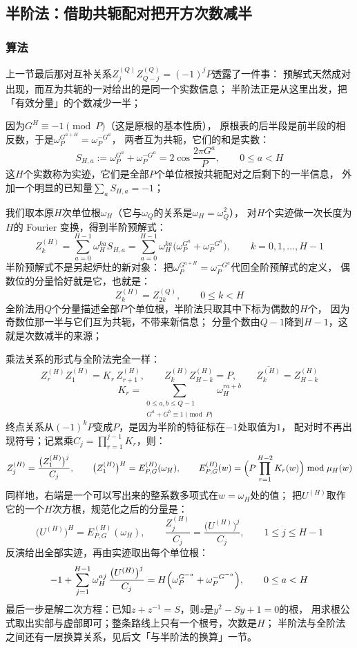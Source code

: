 \documentclass[UTF8,a4paper,11pt]{ctexart}
\begin{document}
\subsection{半阶法：借助共轭配对把开方次数减半}
\subsubsection{算法}
上一节最后那对互补关系$Z^{(Q)}_jZ^{(Q)}_{Q-j}=(-1)^jP$透露了一件事：
预解式天然成对出现，而互为共轭的一对给出的是同一个实数信息；
半阶法正是从这里出发，把「有效分量」的个数减少一半；

因为$G^{H}\equiv-1\pmod P$（这是原根的基本性质），
原根表的后半段是前半段的相反数，于是$\omega_P^{G^{a+H}}=\omega_P^{-G^{a}}$，
两者互为共轭，它们的和是实数：
\[
 S_{H,a}:=\omega_P^{G^{a}}+\omega_P^{-G^{a}}=2\cos\frac{2\pi G^{a}}{P},
 \qquad 0\le a<H
\]
这$H$个实数称为实迹，它们是全部$P$个单位根按共轭配对之后剩下的一半信息，
外加一个明显的已知量$\sum_aS_{H,a}=-1$；\par

我们取本原$H$次单位根$\omega_H$（它与$\omega_Q$的关系是$\omega_H=\omega_Q^2$），
对$H$个实迹做一次长度为$H$的 Fourier 变换，得到半阶预解式：
\[
 Z^{(H)}_k=\sum_{a=0}^{H-1}\omega_H^{ka}S_{H,a}
 =\sum_{a=0}^{H-1}\omega_H^{ka}\bigl(\omega_P^{G^{a}}+\omega_P^{-G^{a}}\bigr),
 \qquad k=0,1,\dots,H-1
\]
半阶预解式不是另起炉灶的新对象：
把$\omega_P^{G^{a+H}}=\omega_P^{-G^a}$代回全阶预解式的定义，
偶数位的分量恰好就是它，也就是：
\[
 Z^{(H)}_k=Z^{(Q)}_{2k},\qquad 0\le k<H
\]
全阶法用$Q$个分量描述全部$P$个单位根，半阶法只取其中下标为偶数的$H$个，
因为奇数位那一半与它们互为共轭，不带来新信息；
分量个数由$Q-1$降到$H-1$，这就是次数减半的来源；\par

乘法关系的形式与全阶法完全一样：
\[
 Z^{(H)}_r Z^{(H)}_1=K_r\,Z^{(H)}_{r+1},\qquad
 Z^{(H)}_k Z^{(H)}_{H-k}=P,\qquad
 \overline{Z^{(H)}_k}=Z^{(H)}_{H-k}
\]
\[
 K_r=\sum_{\substack{0\le a,b\le Q-1\\G^a+G^b\equiv1\pmod P}}\omega_H^{r a+b}
\]
终点关系从$(-1)^kP$变成$P$，是因为半阶的特征标在$-1$处取值为$1$，
配对时不再出现符号；记累乘$C_j=\prod_{r=1}^{j-1}K_r$，则：
\[
 Z^{(H)}_j=\frac{\bigl(Z^{(H)}_1\bigr)^{j}}{C_j},\qquad
 \bigl(Z^{(H)}_1\bigr)^{H}=E^{(H)}_{P,G}(\omega_H),\qquad
 E^{(H)}_{P,G}(w)=\Bigl(P\prod_{r=1}^{H-2}K_r(w)\Bigr)\bmod\mu_H(w)
\]
同样地，右端是一个可以写出来的整系数多项式在$w=\omega_H$处的值；
把$U^{(H)}$取作它的一个$H$次方根，规范化之后的分量是：
\[
 \bigl(U^{(H)}\bigr)^{H}=E^{(H)}_{P,G}(\omega_H),\qquad
 \frac{Z^{(H)}_j}{C_j}=\frac{\bigl(U^{(H)}\bigr)^{j}}{C_j},\qquad 1\le j\le H-1
\]
反演给出全部实迹，再由实迹取出每个单位根：
\[
 -1+\sum_{j=1}^{H-1}\omega_H^{aj}\,\frac{\bigl(U^{(H)}\bigr)^{j}}{C_j}
 =H\Bigl(\omega_P^{G^{-a}}+\omega_P^{-G^{-a}}\Bigr),
 \qquad 0\le a<H
\]
最后一步是解二次方程：已知$z+z^{-1}=S$，则$z$是$y^2-Sy+1=0$的根，
用求根公式取出实部与虚部即可；整条路线上只有一个根号，次数是$H$；
半阶法与全阶法之间还有一层换算关系，见后文「与半阶法的换算」一节。\par
\end{document}
